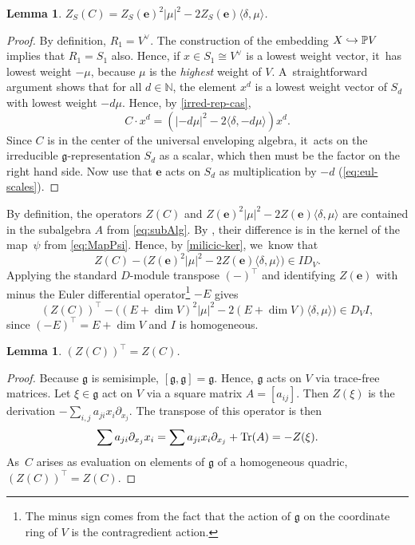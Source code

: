 \documentclass[11pt]{article}
\newcommand\hto{\mathrel{\lhook\joinrel\to}}
\newcommand{\bme}{{\boldsymbol{e}}}
\newtheorem{lem}[thm]{Lemma}
\newcommand{\frg}{\mathfrak{g}}
\DeclareMathOperator{\Tr}{\textup{Tr}}
\begin{document}
\begin{lem}\label{C-vs-e-on-S}
$Z_S(C) = Z_S(\bme)^2|\mu|^2 - 2Z_S(\bme)\langle\delta,\mu\rangle$.
\end{lem}

\begin{proof}
By definition, $R_1=V^\vee$. The construction of the embedding $X\hto \P V$ implies that $R_1=S_1$ also. Hence, if $x\in S_1\cong V^\vee$ is a
lowest weight vector, it~has
lowest weight $-\mu$, because $\mu$ is the \emph{highest} weight of $V$. A~straightforward argument shows that for all $d\in \mathbb{N}$, the element $x^d$ is a
lowest weight vector of $S_d$ with
lowest weight $-d\mu$.
Hence, by \cref{irred-rep-cas},
\[
C\cdot x^d = (|-d\mu|^2 - 2\langle\delta, -d\mu\rangle)x^d.
\]
Since $C$ is in the center of the universal enveloping algebra, it~acts on the irreducible $\frg$-representation $S_d$ as a scalar, which then must be the factor on the right hand side. Now use that $\bme$ acts on $S_d$ as multiplication by $-d$ (\cref{eq:eul-scales}).
\end{proof}

By definition, the operators $Z(C)$ and $Z(\bme)^2|\mu|^2 - 2Z(\bme)\langle\delta,\mu\rangle$ are contained in the subalgebra $A$ from \eqref{eq:subAlg}. By , their difference is in the kernel of the map~$\psi$ from \eqref{eq:MapPsi}. Hence, by \cref{milicic-ker}, we~know that
\[
Z(C) - \bigl(Z(\bme)^2|\mu|^2 - 2Z(\bme)\langle\delta,\mu\rangle\bigr) \in I D_V.
\]
Applying the standard $D$\nobreakdash-mod\-ule transpose $(-)^\top$ and identifying $Z(\bme)$ with minus the Euler differential operator\footnote{The minus sign comes from the fact that the action of $\mathfrak{g}$ on the coordinate ring of $V$ is the contragredient action.} $-E$ gives\vspace*{-3pt}
\begin{equation}\label{eq:ZZtop}
(Z(C))^\top - \bigl((E+\dim{V})^2|\mu|^2 - 2(E+\dim{V})\langle\delta,\mu\rangle\bigr)\in D_V I,
\end{equation}
since $(-E)^\top=E+\dim V$ and $I$ is homogeneous.

\begin{lem}\label{ZZtop}
$(Z(C))^\top = Z(C)$.
\end{lem}

\begin{proof}
Because $\frg$ is semisimple, $[\frg,\frg]=\frg$. Hence, $\frg$ acts on $V$ via trace-free matrices. Let $\xi\in \frg$ act on $V$ via a square matrix $A=[a_{ij}]$. Then $Z(\xi)$ is the derivation $-\sum_{i,j}a_{ji}x_i\partial_{x_j}$. The transpose of this operator is then\vspace*{-3pt}
\[
\sum a_{ji}\partial_{x_j} x_i = \sum a_{ji} x_i \partial_{x_j} +\Tr(A) = -Z(\xi).
\]
As~$C$ arises as evaluation on elements of $\frg$ of a homogeneous quadric, $(Z(C))^\top=Z(C)$.
\end{proof}
\end{document}
